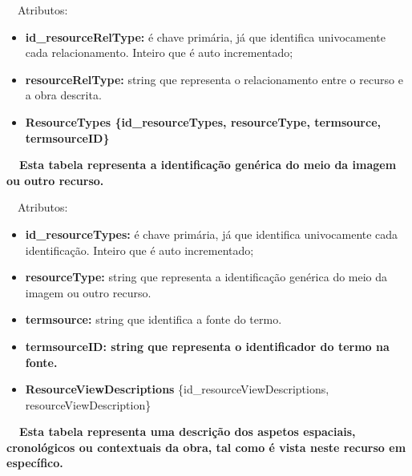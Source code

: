 \documentclass[letterpaper]{article}
\newcommand\textstyleStrongEmphasis[1]{\textbf{#1}}
\newcommand\liststyleLi{%
\renewcommand\labelitemi{{\textbullet}}
\renewcommand\labelitemii{[27A2?]}
\renewcommand\labelitemiii{{\textbullet}}
\renewcommand\labelitemiv{{\textbullet}}
}
\newcommand\liststyleLvi{%
\renewcommand\labelitemi{[27A2?]}
\renewcommand\labelitemii{[27A2?]}
\renewcommand\labelitemiii{[27A2?]}
\renewcommand\labelitemiv{[27A2?]}
}
\begin{document}
\bigskip

{
\ \ Atributos:}

\liststyleLvi
\begin{itemize}
\item {
\textbf{id\_resourceRelType}\textbf{:} \'e chave prim\'aria, j\'a que
identifica univocamente cada relacionamento. Inteiro que \'e auto
incrementado;}
\item {
\textbf{resourceRelType:} string que representa o relacionamento entre o
recurso e a obra descrita.}
\end{itemize}

\bigskip

\liststyleLi
\begin{itemize}
\item {\bfseries
ResourceTypes\textmd{ \{}\textmd{id\_resourceTypes}\textmd{,
resourceType, termsource, termsourceID\}}}
\end{itemize}
{\bfseries
\foreignlanguage{english}{\textmd{\ \ Esta
}}\textstyleStrongEmphasis{\foreignlanguage{english}{\textmd{tabela}}}\foreignlanguage{english}{\textmd{
representa a identifica\c{c}\~ao gen\'erica do meio da imagem ou outro
recurso}}\foreignlanguage{english}{\textmd{.}}}


\bigskip

{
\ \ Atributos:}

\liststyleLvi
\begin{itemize}
\item {
\textbf{id\_resourceTypes}\textbf{:} \'e chave prim\'aria, j\'a que
identifica univocamente cada identifica\c{c}\~ao. Inteiro que \'e auto
incrementado;}
\item {
\textbf{resourceType:} string que representa a identifica\c{c}\~ao
gen\'erica do meio da imagem ou outro recurso.}
\item {
\textbf{termsource:} string que identifica a fonte do termo.}
\item {\bfseries
termsourceID\textmd{: string que representa o identificador do termo na
fonte.}}
\end{itemize}

\bigskip

\liststyleLi
\begin{itemize}
\item {
\textbf{ResourceViewDescriptions} \{id\_resourceViewDescriptions,
resourceViewDescription\}}
\end{itemize}
{\bfseries
\foreignlanguage{english}{\textmd{\ \ }}\foreignlanguage{english}{\textmd{Esta
}}\textstyleStrongEmphasis{\foreignlanguage{english}{\textmd{tabela}}}\foreignlanguage{english}{\textmd{
representa uma descri\c{c}\~ao dos aspetos espaciais, cronol\'ogicos ou
contextuais da obra, tal como \'e vista neste recurso em
espec\'ifico.}}}
\end{document}
